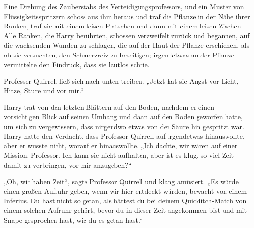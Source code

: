 Eine Drehung des Zauberstabs des Verteidigungsprofessors, und ein Muster von Flüssigkeitsspritzern schoss aus ihm heraus und traf die Pflanze in der Nähe ihrer Ranken, traf sie mit einem leisen Platschen und dann mit einem leisen Zischen. Alle Ranken, die Harry berührten, schossen verzweifelt zurück und begannen, auf die wachsenden Wunden zu schlagen, die auf der Haut der Pflanze erschienen, als ob sie versuchten, den Schmerzreiz zu beseitigen; irgendetwas an der Pflanze vermittelte den Eindruck, dass sie lautlos schrie.

Professor Quirrell ließ sich nach unten treiben.
„Jetzt hat sie Angst vor Licht, Hitze, Säure und vor mir.“

Harry trat von den letzten Blättern auf den Boden, nachdem er einen vorsichtigen Blick auf seinen Umhang und dann auf den Boden geworfen hatte, um sich zu vergewissern, dass nirgendwo etwas von der Säure hin gespritzt war. Harry hatte den Verdacht, dass Professor Quirrell auf irgendetwas hinauswollte, aber er wusste nicht, worauf er hinauswollte.
„Ich dachte, wir wären auf einer Mission, Professor. Ich kann sie nicht aufhalten, aber ist es klug, so viel Zeit damit zu verbringen, vor mir anzugeben?“

„Oh, wir haben Zeit“, sagte Professor Quirrell und klang amüsiert.
„Es würde einen großen Aufruhr geben, wenn wir hier entdeckt würden, bewacht von einem Inferius. Du hast nicht so getan, als hättest du bei deinem Quidditch-Match von einem solchen Aufruhr gehört, bevor du in dieser Zeit angekommen bist und mit Snape gesprochen hast, wie du es getan hast.“


